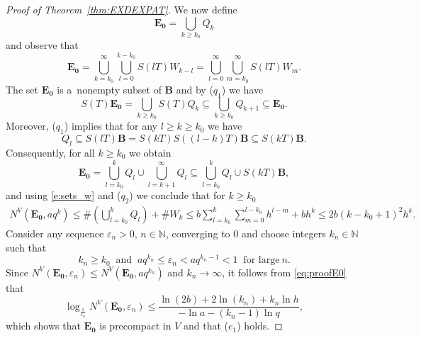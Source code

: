 \documentclass[a4paper,12pt,reqno]{amsart}
\theoremstyle{plain}
\theoremstyle{definition}
\numberwithin{equation}{section}
\newcommand{\N}{\mathbb{N}}
\newcommand{\eps}{\varepsilon}
\renewcommand{\geq}{\geqslant}
\renewcommand{\leq}{\leqslant}
\begin{document}
\begin{proof}[Proof of Theorem~\ref{thm:EXDEXPAT}]
We now define
$$\mathbf{E_0}=\bigcup_{k\geq k_0}Q_{k}$$
and observe that
$$\mathbf{E_0}=\bigcup_{k=k_0}^{\infty}\bigcup_{l=0}^{k-k_0}S(lT)W_{k-l}
=\bigcup_{l=0}^{\infty}\bigcup_{m=k_0}^{\infty}S(lT)W_{m}.$$
The set $\mathbf{E_0}$ is a~nonempty subset of $\mathbf{B}$ and by ($q_1$) we have
$$S(T)\mathbf{E_0}=\bigcup_{k\geq k_0}S(T)Q_{k}\subseteq\bigcup_{k\geq k_0}Q_{k+1}\subseteq\mathbf{E_0}.$$
Moreover,  ($q_1$) implies that for any $l\geq k\geq k_0$ we have
$$Q_{l}\subseteq S(lT)\mathbf{B}=S(kT)S((l-k)T)\mathbf{B}\subseteq S(kT)\mathbf{B}.$$
Consequently, for all $k\geq k_0$ we obtain
$$\mathbf{E_0}=\bigcup_{l=k_0}^{k}Q_{l}\cup\bigcup_{l=k+1}^{\infty}Q_{l}
\subseteq\bigcup_{l=k_0}^{k}Q_{l}\cup S(kT)\mathbf{B},$$
and using \eqref{e:sets_w} and ($q_2$) we conclude that for $k\geq k_0$
\begin{align}\label{eq:proofE0}
N^{V}(\mathbf{E_0},aq^{k})\leq\#\left(\bigcup_{l=k_0}^{k}Q_{l}\right)+\# W_{k}\leq
b\sum_{l=k_0}^{k}\sum_{m=0}^{l-k_0}h^{l-m}+bh^{k}\leq 2b(k-k_0+1)^{2}h^{k}.
\end{align}
Consider any sequence $\eps_{n}>0$, $n\in\N$, converging to $0$ and choose integers $k_n\in\N$ such that
$$k_n\geq k_0\ \text{ and }\ a q^{k_{n}}\leq\eps_n<a q^{k_n-1}<1\ \text{ for large}\ n.$$
Since $N^{V}(\mathbf{E_0},\eps_n)\leq N^{V}(\mathbf{E_0},a q^{k_{n}})$ and $k_n\to\infty$, it follows from \eqref{eq:proofE0} that
$$\log_{\frac{1}{\eps_n}}N^{V}(\mathbf{E_0},\eps_n)\leq\frac{\ln(2b)+2\ln(k_n)+k_{n}\ln{h}}{-\ln{a}-(k_{n}-1)\ln{q}},$$
which shows that  $\mathbf{E_0}$ is precompact in $V$ and that ($e_1$) holds.


\end{proof}
\end{document}
